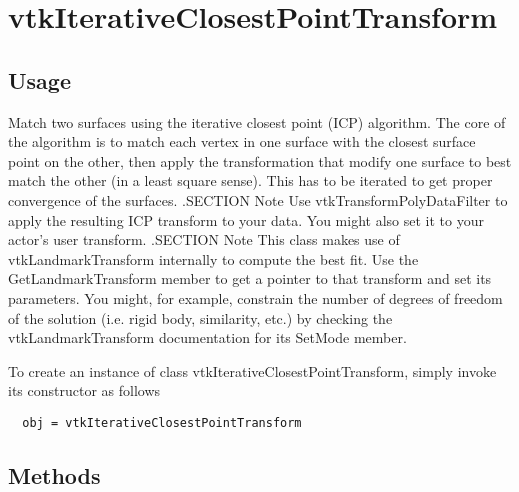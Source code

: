 \section{vtkIterativeClosestPointTransform}

\subsection{Usage}

 Match two surfaces using the iterative closest point (ICP) algorithm.
 The core of the algorithm is to match each vertex in one surface with 
 the closest surface point on the other, then apply the transformation
 that modify one surface to best match the other (in a least square sense).
 This has to be iterated to get proper convergence of the surfaces.
 .SECTION Note
 Use vtkTransformPolyDataFilter to apply the resulting ICP transform to 
 your data. You might also set it to your actor's user transform.
 .SECTION Note
 This class makes use of vtkLandmarkTransform internally to compute the
 best fit. Use the GetLandmarkTransform member to get a pointer to that
 transform and set its parameters. You might, for example, constrain the
 number of degrees of freedom of the solution (i.e. rigid body, similarity,
 etc.) by checking the vtkLandmarkTransform documentation for its SetMode
 member.

To create an instance of class vtkIterativeClosestPointTransform, simply
invoke its constructor as follows
\begin{verbatim}
  obj = vtkIterativeClosestPointTransform
\end{verbatim}
\subsection{Methods}

